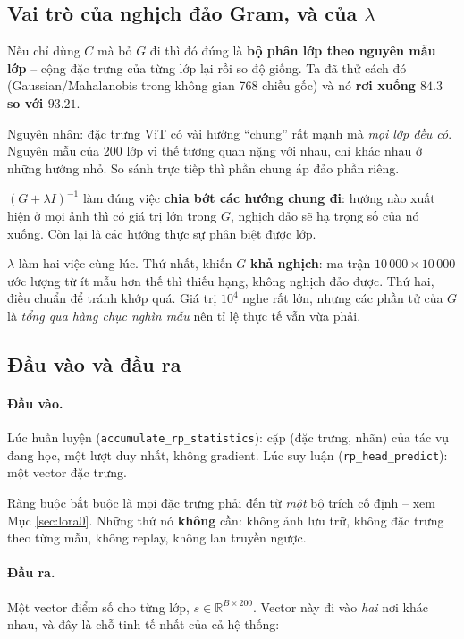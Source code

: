 \documentclass[11pt,a4paper]{article}
\begin{document}
\subsection{Vai trò của nghịch đảo Gram, và của $\lambda$}

Nếu chỉ dùng $C$ mà bỏ $G$ đi thì đó đúng là \textbf{bộ phân lớp theo nguyên mẫu
lớp} -- cộng đặc trưng của từng lớp lại rồi so độ giống. Ta đã thử cách đó
(Gaussian/Mahalanobis trong không gian 768 chiều gốc) và nó \textbf{rơi xuống
$84.3$ so với $93.21$}.

Nguyên nhân: đặc trưng ViT có vài hướng ``chung'' rất mạnh mà \emph{mọi lớp đều
có}. Nguyên mẫu của 200 lớp vì thế tương quan nặng với nhau, chỉ khác nhau ở
những hướng nhỏ. So sánh trực tiếp thì phần chung áp đảo phần riêng.

$(G + \lambda I)^{-1}$ làm đúng việc \textbf{chia bớt các hướng chung đi}: hướng
nào xuất hiện ở mọi ảnh thì có giá trị lớn trong $G$, nghịch đảo sẽ hạ trọng số
của nó xuống. Còn lại là các hướng thực sự phân biệt được lớp.

$\lambda$ làm hai việc cùng lúc. Thứ nhất, khiến $G$ \textbf{khả nghịch}: ma trận
$10\,000 \times 10\,000$ ước lượng từ ít mẫu hơn thế thì thiếu hạng, không nghịch
đảo được. Thứ hai, điều chuẩn để tránh khớp quá. Giá trị $10^4$ nghe rất lớn,
nhưng các phần tử của $G$ là \emph{tổng qua hàng chục nghìn mẫu} nên tỉ lệ thực
tế vẫn vừa phải.

\subsection{Đầu vào và đầu ra}

\paragraph{Đầu vào.}
Lúc huấn luyện (\texttt{accumulate\_rp\_statistics}): cặp (đặc trưng, nhãn) của
tác vụ đang học, một lượt duy nhất, không gradient. Lúc suy luận
(\texttt{rp\_head\_predict}): một vector đặc trưng.

Ràng buộc bắt buộc là mọi đặc trưng phải đến từ \emph{một} bộ trích cố định --
xem Mục \ref{sec:lora0}. Những thứ nó \textbf{không} cần: không ảnh lưu trữ,
không đặc trưng theo từng mẫu, không replay, không lan truyền ngược.

\paragraph{Đầu ra.}
Một vector điểm số cho từng lớp, $s \in \mathbb{R}^{B \times 200}$. Vector này đi
vào \emph{hai} nơi khác nhau, và đây là chỗ tinh tế nhất của cả hệ thống:
\end{document}
